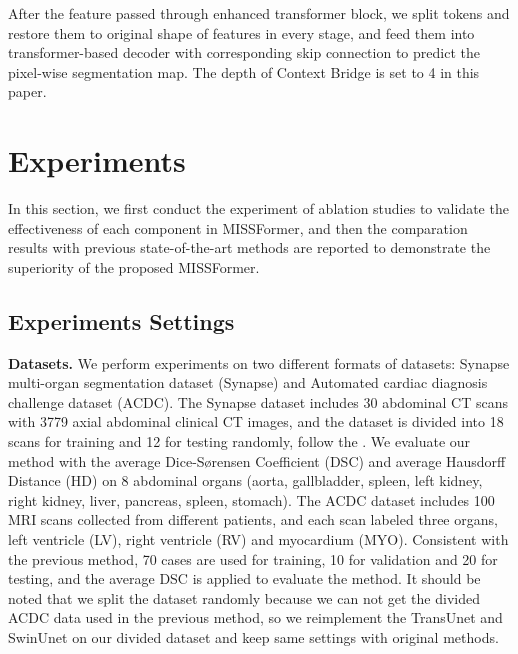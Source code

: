 \documentclass[letterpaper]{article} \usepackage{aaai22}  \usepackage{times}  \usepackage{helvet}  \usepackage{courier}  \usepackage[hyphens]{url}  \usepackage{graphicx} \urlstyle{rm} \def\UrlFont{\rm}  \usepackage{natbib}  \usepackage{caption} \DeclareCaptionStyle{ruled}{labelfont=normalfont,labelsep=colon,strut=off} \frenchspacing  \setlength{\pdfpagewidth}{8.5in}  \setlength{\pdfpageheight}{11in}  \usepackage{algorithm}
\begin{document}
After the feature passed through  enhanced transformer block, we split tokens and restore them to original shape of features in every stage, and feed them into transformer-based decoder with corresponding skip connection to predict the pixel-wise segmentation map. The depth of Context Bridge is set to 4 in this paper.
\section{Experiments}
In this section, we first conduct the experiment of ablation studies to validate the effectiveness of each component in MISSFormer, and then the comparation results with previous state-of-the-art methods are reported to demonstrate the superiority of the proposed MISSFormer.
\subsection{Experiments Settings}
\textbf{Datasets.} We perform experiments on two different formats of datasets: Synapse multi-organ segmentation dataset (Synapse) and Automated cardiac diagnosis challenge dataset (ACDC). The Synapse dataset includes 30 abdominal CT scans with 3779 axial abdominal clinical CT images, and the dataset is divided into 18 scans for training and 12 for testing randomly, follow the \cite{Cao2021,Chen2021}. We evaluate our method with the average Dice-Sørensen Coefficient (DSC) and average Hausdorff Distance (HD) on 8 abdominal organs (aorta, gallbladder, spleen, left kidney, right kidney, liver, pancreas, spleen, stomach). The ACDC dataset includes 100 MRI scans collected from different patients, and each scan labeled three organs, left ventricle (LV), right ventricle (RV) and myocardium (MYO). Consistent with the previous method\cite{Cao2021,Chen2021}, 70 cases are used for training, 10 for validation and 20 for testing, and the average DSC is applied to evaluate the method. It should be noted that we split the dataset randomly because we can not get the divided ACDC data used in the previous method, so we reimplement the TransUnet\cite{Chen2021} and SwinUnet\cite{Cao2021} on our divided dataset and keep same settings with original methods.
\end{document}

